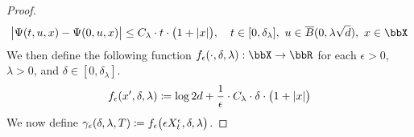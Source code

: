 \begin{proof}
  \begin{equation*}
    \big| \aff(t, \momentVar, \stateVar) - \aff(0, \momentVar, \stateVar) \big| \leq C_\lambda \cdot t \cdot \big( 1 + |\stateVar| \big), \quad t \in [0,\delta_\lambda], ~ \momentVar \in  \closedBall{0}{\lambda\sqrt d}, ~ \stateVar \in  \stateSpace
  \end{equation*}
  We then define the following function $f_\epsilon(\cdot,\delta,\lambda): \stateSpace \rightarrow \bbR$ for each $\epsilon > 0$, $\lambda > 0$, and $\delta \in [0,\delta_\lambda]$.
  \begin{equation*}
    f_\epsilon(x',\delta,\lambda) \coloneqq \log 2d + \frac{1}{\epsilon} \cdot C_\lambda \cdot \delta \cdot \big( 1 + |x| \big)
  \end{equation*}
  We now define $\gamma_\epsilon(\delta, \lambda, T) \coloneqq f_\epsilon\big( \epsilon X^\epsilon_t, \delta, \lambda \big)$.


\end{proof}
